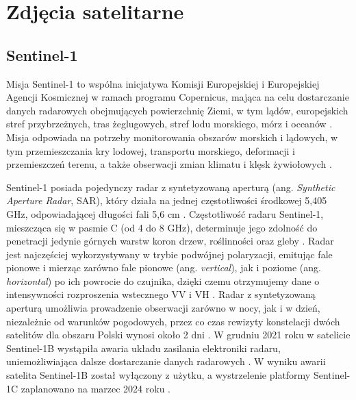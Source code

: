 \documentclass{amuthesis}
\begin{document}
\hypertarget{sec-satellite-imagery}{%
\section{Zdjęcia satelitarne}\label{sec-satellite-imagery}}

\hypertarget{sec-sentinel1}{%
\subsection{Sentinel-1}\label{sec-sentinel1}}

Misja Sentinel-1 to wspólna inicjatywa Komisji Europejskiej i
Europejskiej Agencji Kosmicznej w ramach programu Copernicus, mająca na
celu dostarczanie danych radarowych obejmujących powierzchnię Ziemi, w
tym lądów, europejskich stref przybrzeżnych, tras żeglugowych, stref
lodu morskiego, mórz i oceanów
\autocite{hejmanowska_2020_dane,sentinel1_mission_objectives}. Misja
odpowiada na potrzeby monitorowania obszarów morskich i lądowych, w tym
przemieszczania kry lodowej, transportu morskiego, deformacji i
przemieszczeń terenu, a także obserwacji zmian klimatu i klęsk
żywiołowych
\autocite{hejmanowska_2020_dane,sentinel1_mission_objectives}.

Sentinel-1 posiada pojedynczy radar z syntetyzowaną aperturą (ang.
\emph{Synthetic Aperture Radar}, SAR), który działa na jednej
częstotliwości środkowej 5,405 GHz, odpowiadającej długości fali 5,6 cm
\autocite{sentinel1_lulc,sentinel1_instrument_payload}. Częstotliwość
radaru Sentinel-1, mieszcząca się w pasmie C (od 4 do 8 GHz),
determinuje jego zdolność do penetracji jedynie górnych warstw koron
drzew, roślinności oraz gleby \autocite{sentinel_1_user_guide}. Radar
jest najczęściej wykorzystywany w trybie podwójnej polaryzacji, emitując
fale pionowe i mierząc zarówno fale pionowe (ang. \emph{vertical}), jak
i poziome (ang. \emph{horizontal}) po ich powrocie do czujnika, dzięki
czemu otrzymujemy dane o intensywności rozproszenia wstecznego VV i VH
\autocite{sentinel1_lulc}. Radar z syntetyzowaną aperturą umożliwia
prowadzenie obserwacji zarówno w nocy, jak i w dzień, niezależnie od
warunków pogodowych, przez co czas rewizyty konstelacji dwóch satelitów
dla obszaru Polski wynosi około 2 dni
\autocite{attema_2008_s1,sentinel1_revisit}. W grudniu 2021 roku w
satelicie Sentinel-1B wystąpiła awaria układu zasilania elektroniki
radaru, uniemożliwiająca dalsze dostarczanie danych radarowych
\autocite{sentinel_1b}. W wyniku awarii satelita Sentinel-1B został
wyłączony z użytku, a wystrzelenie platformy Sentinel-1C zaplanowano na
marzec 2024 roku \autocite{sentinel_1b,sentinel1_eoportal}.
\end{document}
